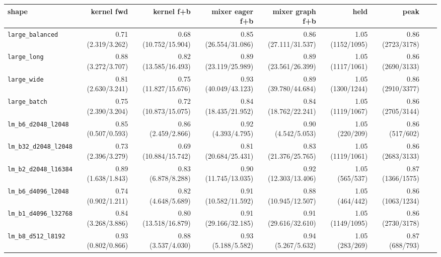 \begin{tabular}{l r r r r r r r r }
\toprule
shape & kernel fwd & kernel f+b & mixer eager f+b & mixer graph f+b & held & peak  \\
\midrule
\texttt{large\_balanced} & 0.71 (2.319/3.262) & 0.68 (10.752/15.904) & 0.85 (26.554/31.086) & 0.86 (27.111/31.537) & 1.05 (1152/1095) & 0.86 (2723/3178) \\
\texttt{large\_long} & 0.88 (3.272/3.707) & 0.82 (13.585/16.493) & 0.89 (23.119/25.989) & 0.89 (23.561/26.399) & 1.05 (1117/1061) & 0.86 (2690/3133) \\
\texttt{large\_wide} & 0.81 (2.630/3.241) & 0.75 (11.827/15.676) & 0.93 (40.049/43.123) & 0.89 (39.780/44.684) & 1.05 (1300/1244) & 0.86 (2910/3377) \\
\texttt{large\_batch} & 0.75 (2.390/3.204) & 0.72 (10.873/15.075) & 0.84 (18.435/21.952) & 0.84 (18.762/22.241) & 1.05 (1119/1067) & 0.86 (2705/3144) \\
\texttt{lm\_b6\_d2048\_l2048} & 0.85 (0.507/0.593) & 0.86 (2.459/2.866) & 0.92 (4.393/4.795) & 0.90 (4.542/5.053) & 1.05 (220/209) & 0.86 (517/602) \\
\texttt{lm\_b32\_d2048\_l2048} & 0.73 (2.396/3.279) & 0.69 (10.884/15.742) & 0.81 (20.684/25.431) & 0.83 (21.376/25.765) & 1.05 (1119/1061) & 0.86 (2683/3133) \\
\texttt{lm\_b2\_d2048\_l16384} & 0.89 (1.638/1.843) & 0.83 (6.878/8.288) & 0.90 (11.745/13.035) & 0.92 (12.303/13.406) & 1.05 (565/537) & 0.87 (1366/1575) \\
\texttt{lm\_b6\_d4096\_l2048} & 0.74 (0.902/1.211) & 0.82 (4.648/5.689) & 0.91 (10.582/11.592) & 0.88 (10.945/12.507) & 1.05 (464/442) & 0.86 (1063/1234) \\
\texttt{lm\_b1\_d4096\_l32768} & 0.84 (3.268/3.886) & 0.80 (13.518/16.879) & 0.91 (29.166/32.185) & 0.91 (29.616/32.610) & 1.05 (1149/1095) & 0.86 (2730/3178) \\
\texttt{lm\_b8\_d512\_l8192} & 0.93 (0.802/0.866) & 0.88 (3.537/4.030) & 0.93 (5.188/5.582) & 0.94 (5.267/5.632) & 1.05 (283/269) & 0.87 (688/793) \\
\bottomrule
\end{tabular}

